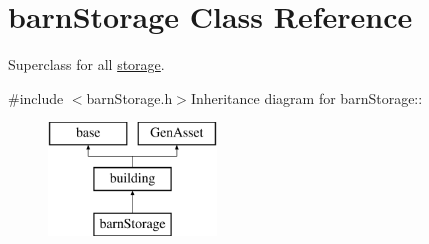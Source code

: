 \hypertarget{classbarn_storage}{
\section{barnStorage Class Reference}
\label{classbarn_storage}
}


Superclass for all \hyperlink{classstorage}{storage}.  


{\ttfamily \#include $<$barnStorage.h$>$}Inheritance diagram for barnStorage::\begin{figure}[H]
\begin{center}
\leavevmode
\includegraphics[height=3cm]{classbarn_storage}
\end{center}
\end{figure}
